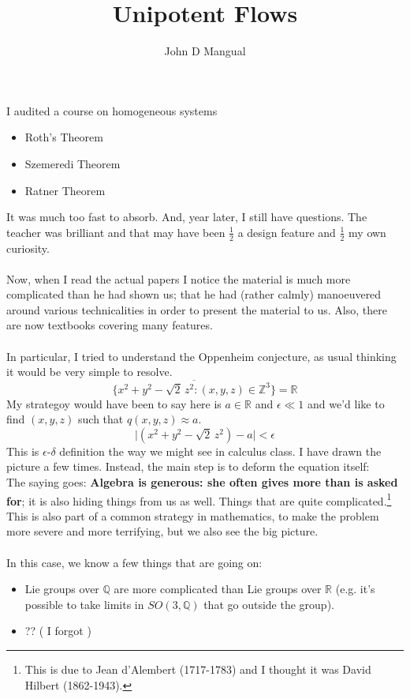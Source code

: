 \documentclass[12pt]{article}
\title{Unipotent Flows}
\author{John D Mangual}
\date{}
\begin{document}
\selectfont \fontsize{12.5}{15}\selectfont

\maketitle

\noindent I audited a course on homogeneous systems 
\begin{itemize}
\item Roth's Theorem
\item Szemeredi Theorem
\item Ratner Theorem
\end{itemize}
It was much too fast to absorb.  And, year later, I still have questions.  The teacher was brilliant and that may have been $\frac{1}{2}$ a design feature and $\frac{1}{2}$ my own curiosity.  \\ \\
Now, when I read the actual papers I notice the material is much more complicated than he had shown us; that he had (rather calmly) manoeuvered around various technicalities in order to present the material to us.  Also, there are now textbooks covering many features. \\ \\
In particular, I tried to understand the Oppenheim conjecture, as usual thinking it would be very simple to resolve.
$$  \overline{ \Big\{  x^2 + y^2 - \sqrt{2} \, z^2 : (x,y,z) \in \mathbb{Z}^3 \Big\} } = \mathbb{R} $$
My strategoy would have been to say here is $a \in \mathbb{R}$ and $\epsilon \ll 1$ and we'd like to find $(x,y,z)$ such that $q(x,y,z) \approx a$.
$$ \Big| (x^2 + y^2 - \sqrt{2} \, z^2) - a \Big| < \epsilon  $$
This is $\epsilon$-$\delta$ definition the way we might see in calculus class.  I have drawn the picture a few times.  Instead, the main step is to deform the equation itself:
$$ $$
The saying goes: \textbf{Algebra is generous: she often gives more than is asked for}; it is also hiding things from us as well.  Things that are quite complicated.\footnote{This is due to Jean d'Alembert (1717-1783) and I thought it was David Hilbert (1862-1943).}   This is also part of a common strategy in mathematics, to make the problem more severe and more terrifying, but we also see the big picture. \\ \\
In this case, we know a few things that are going on:
\begin{itemize}
\item Lie groups over $\mathbb{Q}$ are more complicated than Lie groups over $\mathbb{R}$ (e.g. it's possible to take limits in $SO(3, \mathbb{Q})$ that go outside the group).
\item ?? ( I forgot ) 
\end{itemize}
\end{document}
